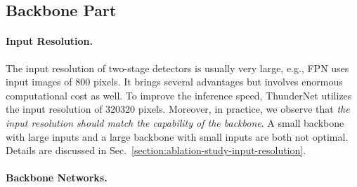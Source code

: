 \documentclass[10pt,twocolumn,letterpaper]{article}
\begin{document}
\subsection{Backbone Part}

\paragraph{Input Resolution.}


The input resolution of two-stage detectors is usually very large, e.g., FPN \cite{lin2017feature} uses input images of 800 pixels.
It brings several advantages but involves enormous computational cost as well.
To improve the inference speed, ThunderNet utilizes the input resolution of 320320 pixels.
Moreover, in practice, we observe that \emph{the input resolution should match the capability of the backbone}.
A small backbone with large inputs and a large backbone with small inputs are both not optimal.
Details are discussed in Sec.~\ref{section:ablation-study-input-resolution}.

\vspace{-12pt}
\paragraph{Backbone Networks.}
\end{document}
